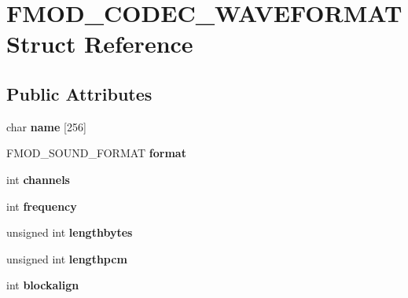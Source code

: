\hypertarget{structFMOD__CODEC__WAVEFORMAT}{}\section{F\+M\+O\+D\+\_\+\+C\+O\+D\+E\+C\+\_\+\+W\+A\+V\+E\+F\+O\+R\+M\+AT Struct Reference}
\label{structFMOD__CODEC__WAVEFORMAT}
\subsection*{Public Attributes}
\begin{DoxyCompactItemize}
\item 
\mbox{\label{structFMOD__CODEC__WAVEFORMAT_a6702bbdb43e30c40c614e383ade68d1f}} 
char {\bfseries name} \mbox{[}256\mbox{]}
\item 
\mbox{\label{structFMOD__CODEC__WAVEFORMAT_aced3a8f677c8663353851db51c43f581}} 
F\+M\+O\+D\+\_\+\+S\+O\+U\+N\+D\+\_\+\+F\+O\+R\+M\+AT {\bfseries format}
\item 
\mbox{\label{structFMOD__CODEC__WAVEFORMAT_aed37ce9c60c7cafb4b1335285a97d890}} 
int {\bfseries channels}
\item 
\mbox{\label{structFMOD__CODEC__WAVEFORMAT_a6a54a1b79daa79dc605d9145f04aaddb}} 
int {\bfseries frequency}
\item 
\mbox{\label{structFMOD__CODEC__WAVEFORMAT_a2e9d8c283bfc9b69e9f6a22c04507e62}} 
unsigned int {\bfseries lengthbytes}
\item 
\mbox{\label{structFMOD__CODEC__WAVEFORMAT_a0cccdeb82b13ac9342c24401c5a50f5f}} 
unsigned int {\bfseries lengthpcm}
\item 
\mbox{\label{structFMOD__CODEC__WAVEFORMAT_a46df2a2789c6c438cd773762ed397a6f}} 
int {\bfseries blockalign}
\item 
\mbox{\label{structFMOD__CODEC__WAVEFORMAT_ae795e36327ba4772301f09501b2a8cc0}} 

\end{DoxyCompactItemize}
